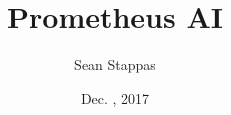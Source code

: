 \documentclass[final,hyperref={pdfpagelabels=false}]{beamer}
\title{\huge Prometheus AI}
\author{Sean Stappas}
\institute{McGill University}
\date{Dec. \nth{1}, 2017}
\begin{document}
	\begin{frame}
		\begin{columns}
			\begin{column}{.49\textwidth}
			\end{column}
		\end{columns}
	\end{frame}
\end{document}
